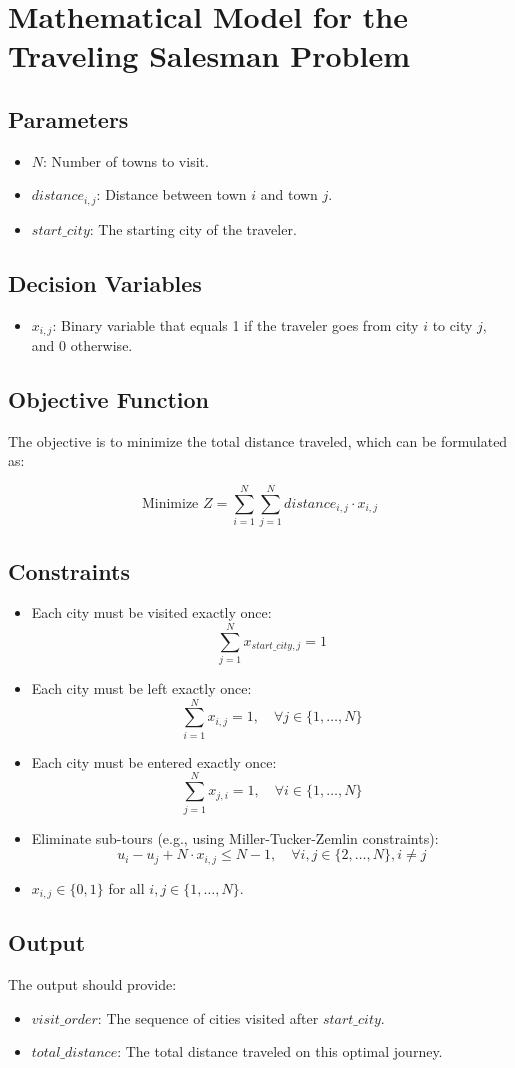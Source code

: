 \documentclass{article}
\begin{document}
\section*{Mathematical Model for the Traveling Salesman Problem}

\subsection*{Parameters}
\begin{itemize}
    \item $N$: Number of towns to visit.
    \item $distance_{i,j}$: Distance between town $i$ and town $j$.
    \item $start\_city$: The starting city of the traveler.
\end{itemize}

\subsection*{Decision Variables}
\begin{itemize}
    \item $x_{i,j}$: Binary variable that equals 1 if the traveler goes from city $i$ to city $j$, and 0 otherwise.
\end{itemize}

\subsection*{Objective Function}
The objective is to minimize the total distance traveled, which can be formulated as:

\[
\text{Minimize } Z = \sum_{i=1}^{N} \sum_{j=1}^{N} distance_{i,j} \cdot x_{i,j}
\]

\subsection*{Constraints}
\begin{itemize}
    \item Each city must be visited exactly once:
    \[
    \sum_{j=1}^{N} x_{start\_city,j} = 1
    \]
    \item Each city must be left exactly once:
    \[
    \sum_{i=1}^{N} x_{i,j} = 1, \quad \forall j \in \{1, \ldots, N\}
    \]
    \item Each city must be entered exactly once:
    \[
    \sum_{j=1}^{N} x_{j,i} = 1, \quad \forall i \in \{1, \ldots, N\}
    \]
    \item Eliminate sub-tours (e.g., using Miller-Tucker-Zemlin constraints):
    \[
    u_i - u_j + N \cdot x_{i,j} \leq N-1, \quad \forall i,j \in \{2, \ldots, N\}, i \neq j
    \]
    \item $x_{i,j} \in \{0, 1\}$ for all $i,j \in \{1, \ldots, N\}$.
\end{itemize}

\subsection*{Output}
The output should provide:
\begin{itemize}
    \item $visit\_order$: The sequence of cities visited after $start\_city$.
    \item $total\_distance$: The total distance traveled on this optimal journey.
\end{itemize}
\end{document}
